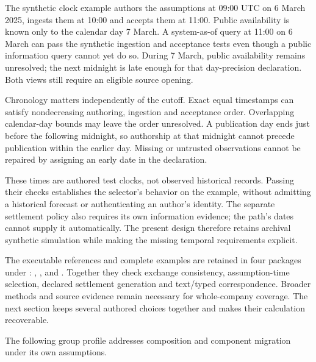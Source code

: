 The synthetic clock example authors the assumptions at 09:00 UTC on 6 March
2025, ingests them at 10:00 and accepts them at 11:00. Public availability is
known only to the calendar day 7 March. A system-as-of query at 11:00 on 6 March
can pass the synthetic ingestion and acceptance tests even though a public
information query cannot yet do so. During 7 March, public availability remains
unresolved; the next midnight is late enough for that day-precision declaration.
Both views still require an eligible source opening.

Chronology matters independently of the cutoff. Exact equal timestamps can
satisfy nondecreasing authoring, ingestion and acceptance order. Overlapping
calendar-day bounds may leave the order unresolved. A publication day ends
just before the following midnight, so authorship at that midnight cannot
precede publication within the earlier day. Missing or untrusted observations
cannot be repaired by assigning an early date in the declaration.

These times are authored test clocks, not observed historical records. Passing
their checks establishes the selector's behavior on the example, without
admitting a historical forecast or authenticating an author's identity. The
separate settlement policy also requires its own information evidence; the
path's dates cannot supply it automatically. The present design therefore
retains archival synthetic simulation while making the missing temporal
requirements explicit.

The executable references and complete examples are retained in four packages
under :
,
,
 and
.
Together they check exchange consistency, assumption-time selection, declared
settlement generation and text/typed correspondence. Broader methods and source
evidence remain necessary for whole-company coverage. The next section keeps
several authored choices together and makes their calculation recoverable.



The following group profile addresses composition and component migration
under its own assumptions.
